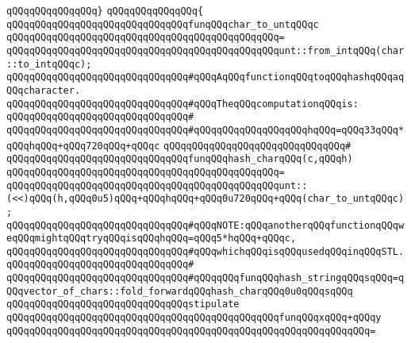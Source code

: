 \verb|qQQqqQQqqQQqqQQq}|\newline
\verb|qQQqqQQqqQQqqQQq{|\newline
\newline
\verb|qQQqqQQqqQQqqQQqqQQqqQQqqQQqqQQqfunqQQqchar_to_untqQQqc|\newline
\verb|qQQqqQQqqQQqqQQqqQQqqQQqqQQqqQQqqQQqqQQqqQQqqQQq=|\newline
\verb|qQQqqQQqqQQqqQQqqQQqqQQqqQQqqQQqqQQqqQQqqQQqqQQqunt::from_intqQQq(char::to_intqQQqc);|\newline
\newline
\verb|qQQqqQQqqQQqqQQqqQQqqQQqqQQqqQQq#qQQqAqQQqfunctionqQQqtoqQQqhashqQQqaqQQqcharacter.|\newline
\verb|qQQqqQQqqQQqqQQqqQQqqQQqqQQqqQQq#qQQqTheqQQqcomputationqQQqis:|\newline
\verb|qQQqqQQqqQQqqQQqqQQqqQQqqQQqqQQq#|\newline
\verb|qQQqqQQqqQQqqQQqqQQqqQQqqQQqqQQq#qQQqqQQqqQQqqQQqqQQqhqQQq=qQQq33qQQq*qQQqhqQQq+qQQq720qQQq+qQQqc|\newline
\verb|qQQqqQQqqQQqqQQqqQQqqQQqqQQqqQQq#|\newline
\verb|qQQqqQQqqQQqqQQqqQQqqQQqqQQqqQQqfunqQQqhash_charqQQq(c,qQQqh)|\newline
\verb|qQQqqQQqqQQqqQQqqQQqqQQqqQQqqQQqqQQqqQQqqQQqqQQq=|\newline
\verb|qQQqqQQqqQQqqQQqqQQqqQQqqQQqqQQqqQQqqQQqqQQqqQQqunt::(<<)qQQq(h,qQQq0u5)qQQq+qQQqhqQQq+qQQq0u720qQQq+qQQq(char_to_untqQQqc);|\newline
\newline
\verb|qQQqqQQqqQQqqQQqqQQqqQQqqQQqqQQq#qQQqNOTE:qQQqanotherqQQqfunctionqQQqweqQQqmightqQQqtryqQQqisqQQqhqQQq=qQQq5*hqQQq+qQQqc,|\newline
\verb|qQQqqQQqqQQqqQQqqQQqqQQqqQQqqQQq#qQQqwhichqQQqisqQQqusedqQQqinqQQqSTL.|\newline
\verb|qQQqqQQqqQQqqQQqqQQqqQQqqQQqqQQq#|\newline
\verb|qQQqqQQqqQQqqQQqqQQqqQQqqQQqqQQq#qQQqqQQqfunqQQqhash_stringqQQqsqQQq=qQQqvector_of_chars::fold_forwardqQQqhash_charqQQq0u0qQQqsqQQq|\newline
\newline
\verb|qQQqqQQqqQQqqQQqqQQqqQQqqQQqqQQqstipulate|\newline
\verb|qQQqqQQqqQQqqQQqqQQqqQQqqQQqqQQqqQQqqQQqqQQqqQQqfunqQQqxqQQq+qQQqy|\newline
\verb|qQQqqQQqqQQqqQQqqQQqqQQqqQQqqQQqqQQqqQQqqQQqqQQqqQQqqQQqqQQqqQQq=|\newline
